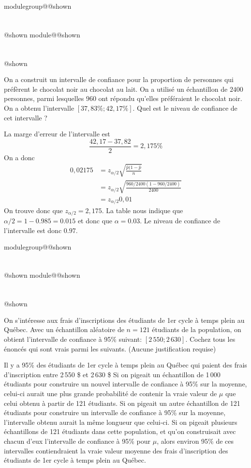\documentclass{Evaluation}
\makeatletter
\newcommand{\currentmodulekey}{}
\newcommand{\currentmoduletitle}{}
\newcommand{\currentgroupkey}{}
\newcommand{\currentgrouptitle}{}
\newcommand{\showmoduleifneeded}{%
  \ifx\currentgroupkey\empty\else
    \expandafter\ifx\csname modulegroup@\currentgroupkey @shown\endcsname\relax
      \section*{\currentgrouptitle}%
      \expandafter\gdef\csname modulegroup@\currentgroupkey @shown\endcsname{1}%
    \fi
  \fi
  \expandafter\ifx\csname module@\currentmodulekey @shown\endcsname\relax
    \section*{\currentmoduletitle}%
    \expandafter\gdef\csname module@\currentmodulekey @shown\endcsname{1}%
  \fi
}
\newenvironment{A22}{\showmoduleifneeded}{}
\makeatother
\begin{document}
\begin{questions}
\begin{A22}
On a construit un intervalle de confiance pour la proportion de personnes qui préfèrent le chocolat noir au chocolat au lait. On a utilisé un échantillon de $2400$ personnes, parmi lesquelles $960$ ont répondu qu’elles préféraient le chocolat noir. On a obtenu l’intervalle $[37, 83\%; 42, 17\%]$. Quel est le niveau de confiance de cet intervalle ?

\begin{solution}
La marge d'erreur de l'intervalle est 
$$ \frac{42,17-37,82}{2} = 2,175\%$$ 
On a donc 
\begin{align*}
0,02175 &= z_{\alpha/2}\sqrt{\frac{\hat{p}{(1-\hat{p}}}{n}} \\ 
&= z_{\alpha/2} \sqrt{\frac{960/2400{(1-960/2400)}}{2400}}\\
&= z_{\alpha/2} 0,01
\end{align*}
On trouve donc que $z_{\alpha/2} = 2,175$. La table nous indique que $\alpha/2 = 1-0.985 = 0.015$ et donc que $\alpha = 0.03$. Le niveau de confiance de l'intervalle est donc $0.97$. 
\end{solution}
\end{A22}

\begin{A22}
\question {} %

On s'intéresse aux frais d'inscriptions des étudiants de 1er cycle à temps plein au Québec. 
Avec un échantillon aléatoire de $n=121$ étudiants de la population, on obtient l'intervalle de confiance à 95\% suivant: $[2\,550;2\,630]$. 
Cochez tous les énoncés qui sont vrais parmi les suivants. (Aucune justification requise)

\begin{checkboxes}
\choice Il y a 95\% des étudiants de 1er cycle à temps plein au Québec qui paient des frais d'inscription entre 2\,550 \$ et 2\,630 \$
\choice Si on pigeait un échantillon de 1\,000 étudiants pour construire un nouvel intervalle de confiance à 95\% sur la moyenne, celui-ci aurait une plus grande probabilité de contenir la vraie valeur de $\mu$ que celui obtenu à partir de 121 étudiants.
\choice Si on pigeait un autre échantillon de 121 étudiants pour construire un intervalle de confiance à 95\% sur la moyenne, l'intervalle obtenu aurait la même longueur que celui-ci.
\choice Si on pigeait plusieurs échantillons de 121 étudiants dans cette population, et qu'on construisait avec chacun d'eux l'intervalle de confiance à 95\% pour $\mu$, alors environ 95\% de ces intervalles contiendraient la vraie valeur moyenne des frais d'inscription des étudiants de 1er cycle à temps plein au Québec. 
\end{checkboxes}


\end{A22}
\end{questions}
\end{document}

